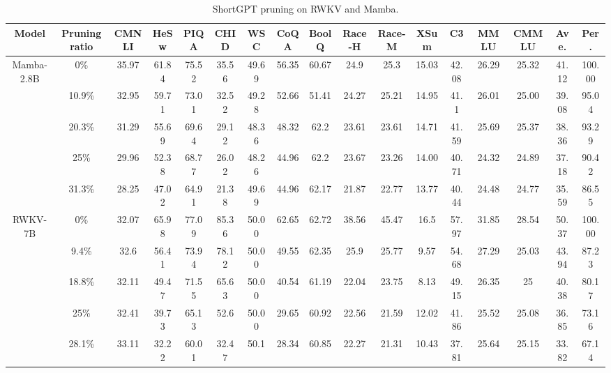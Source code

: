 		
		
		\renewcommand\arraystretch{1.3}
		\begin{table}[t]
			\tiny
			\setlength{\tabcolsep}{2.2pt}
			\caption{ShortGPT pruning on RWKV and Mamba.}
			\label{tab:rwkv_mamba}
			\centering
			\begin{tabular}{c|c|ccccccccccccccc}
				\toprule
				Model & Pruning ratio & CMNLI & HeSw & PIQA & CHID & WSC & CoQA & BoolQ & Race-H & Race-M & XSum & C3 & MMLU & CMMLU  &Ave. & Per. \\
				\midrule
				\multirow{5}{*}{Mamba-2.8B}
				& 0\% & 35.97 & 61.84 & 75.52 & 35.56 & 49.69 & 56.35 & 60.67 & 24.9 & 25.3 & 15.03 & 42.08 & 26.29 & 25.32 & 41.12 & 100.00 \\
				& 10.9\% & 32.95 & 59.71 & 73.01 & 32.52 & 49.28 & 52.66 & 51.41 & 24.27 & 25.21 & 14.95 & 41.1 & 26.01 & 25.00 & 39.08 & 95.04  \\
				& 20.3\% & 31.29 & 55.69 & 69.64 & 29.12 & 48.36 & 48.32 & 62.2 & 23.61 & 23.61 & 14.71 & 41.59 & 25.69 & 25.37 & 38.36 & 93.29 \\
				& 25\% & 29.96 & 52.38 & 68.77 & 26.02 & 48.26 & 44.96 & 62.2 & 23.67 & 23.26 & 14.00 & 40.71 & 24.32 & 24.89 & 37.18 & 90.42 \\
				& 31.3\% & 28.25 & 47.02 & 64.91 & 21.38 & 49.69 & 44.96 & 62.17 & 21.87 & 22.77 & 13.77 & 40.44 & 24.48 & 24.77 & 35.59 & 86.55 \\
				\midrule
				\multirow{5}{*}{RWKV-7B}
				& 0\% & 32.07 & 65.98 & 77.09 & 85.36 & 50.00 & 62.65 & 62.72 & 38.56 & 45.47 & 16.5 & 57.97 & 31.85 & 28.54 & 50.37 & 100.00 \\
				& 9.4\% & 32.6 & 56.41 & 73.94 & 78.12 & 50.00 & 49.55 & 62.35 & 25.9 & 25.77 & 9.57 & 54.68 & 27.29 & 25.03 & 43.94 & 87.23 \\
				& 18.8\% & 32.11 & 49.47 & 71.55 & 65.63 & 50.00 & 40.54 & 61.19 & 22.04 & 23.75 & 8.13 & 49.15 & 26.35 & 25 & 40.38 & 80.17\\
				& 25\% & 32.41 & 39.73 & 65.13 & 52.6 & 50.00 & 29.65 & 60.92 & 22.56 & 21.59 & 12.02 & 41.86 & 25.52 & 25.08 & 36.85 & 73.16\\
				& 28.1\% & 33.11 & 32.22 & 60.01 & 32.47 & 50.1 & 28.34 & 60.85 & 22.27 & 21.31 & 10.43 & 37.81 & 25.64 & 25.15 & 33.82 & 67.14\\
				\bottomrule
			\end{tabular}
		\end{table}
		
		
